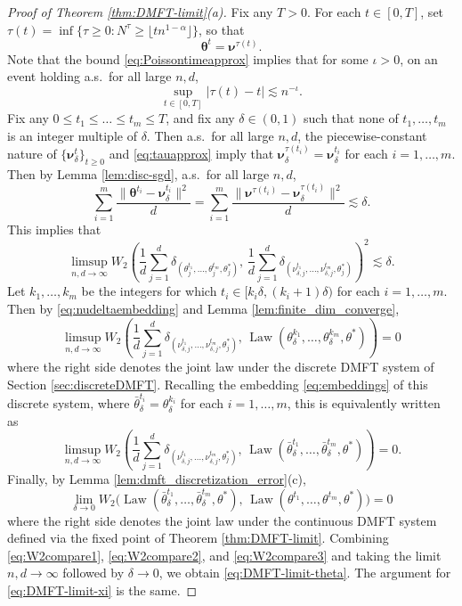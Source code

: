 \documentclass[11pt,letterpaper,reqno]{amsart}
\theoremstyle{definition}
\def\Law{\operatorname{Law}}
\def\btheta{\boldsymbol{\theta}}
\def\bnu{\boldsymbol{\nu}}
\begin{document}
\begin{proof}[Proof of Theorem \ref{thm:DMFT-limit}(a)]
Fix any $T>0$. For each $t \in [0,T]$, set
$\tau(t)=\inf\{\tau \geq 0:N^\tau \geq \lfloor tn^{1-\alpha} \rfloor\}$,
so that
\[\btheta^t=\bnu^{\tau(t)}.\]
Note that the bound \eqref{eq:Poissontimeapprox} implies that for some
$\iota>0$, on an event holding a.s.\ for all large $n,d$,
\begin{equation}\label{eq:tauapprox}
\sup_{t \in [0,T]} |\tau(t)-t| \lesssim n^{-\iota}.
\end{equation}
Fix any $0 \leq t_1 \leq \ldots \leq t_m \leq T$, and fix any
$\delta \in (0,1)$ such that none of $t_1,\ldots,t_m$ is an integer multiple of
$\delta$. Then a.s.\ for all large $n,d$, the piecewise-constant nature of
$\{\bnu_\delta^t\}_{t \geq 0}$ and \eqref{eq:tauapprox} imply that
$\bnu_\delta^{\tau(t_i)}=\bnu_\delta^{t_i}$ for each $i=1,\ldots,m$. Then
by Lemma \ref{lem:disc-sgd}, a.s.\ for all large $n,d$,
\[\sum_{i=1}^m \frac{\|\btheta^{t_i}-\bnu_\delta^{t_i}\|^2}{d}
=\sum_{i=1}^m \frac{\|\bnu^{\tau(t_i)}-\bnu_\delta^{\tau(t_i)}\|^2}{d}
\lesssim \delta.\]
This implies that
\begin{equation}\label{eq:W2compare1}
\limsup_{n,d \to \infty} W_2\left(\frac{1}{d}\sum_{j=1}^d
\delta_{(\theta_j^{t_1},\ldots,\theta_j^{t_m},\theta_j^*)},\,
\frac{1}{d}\sum_{j=1}^d
\delta_{(\nu_{\delta,j}^{t_1},\ldots,\nu_{\delta,j}^{t_m},\theta_j^*)}\right)^2
\lesssim \delta.
\end{equation}
Let $k_1,\ldots,k_m$ be the integers for which $t_i \in
[k_i\delta,(k_i+1)\delta)$ for each $i=1,\ldots,m$. 
Then by
\eqref{eq:nudeltaembedding} and Lemma \ref{lem:finite_dim_converge},
\[\limsup_{n,d \to \infty} W_2\left(\frac{1}{d}\sum_{j=1}^d
\delta_{(\nu_{\delta,j}^{t_1},\ldots,\nu_{\delta,j}^{t_m},\theta_j^*)},
\,\Law(\theta_\delta^{k_1},\ldots,\theta_\delta^{k_m},\theta^*)\right)=0\]
where the right side denotes the joint law under the discrete DMFT system of
Section \ref{sec:discreteDMFT}. Recalling the embedding 
\eqref{eq:embeddings} of this discrete system, where
$\bar\theta_\delta^{t_i}=\theta_\delta^{k_i}$ for each $i=1,\ldots,m$, this is
equivalently written as
\begin{equation}\label{eq:W2compare2}
\limsup_{n,d \to \infty} W_2\left(\frac{1}{d}\sum_{j=1}^d
\delta_{(\nu_{\delta,j}^{t_1},\ldots,\nu_{\delta,j}^{t_m},\theta_j^*)},
\,\Law(\bar\theta_\delta^{t_1},\ldots,\bar\theta_\delta^{t_m},\theta^*)\right)
=0.
\end{equation}
Finally, by Lemma \ref{lem:dmft_discretization_error}(c),
\begin{equation}\label{eq:W2compare3}
\lim_{\delta \to 0} W_2\Big(
\Law(\bar\theta_\delta^{t_1},\ldots,\bar\theta_\delta^{t_m},\theta^*),\,
\Law(\theta^{t_1},\ldots,\theta^{t_m},\theta^*)\Big)=0
\end{equation}
where the right side denotes the joint law under the continuous DMFT system
defined via the fixed point of
Theorem \ref{thm:DMFT-limit}. Combining \eqref{eq:W2compare1},
\eqref{eq:W2compare2}, and \eqref{eq:W2compare3} and taking the limit $n,d \to
\infty$ followed by $\delta \to 0$, we obtain \eqref{eq:DMFT-limit-theta}.
The argument for \eqref{eq:DMFT-limit-xi} is the same.
\end{proof}
\end{document}
